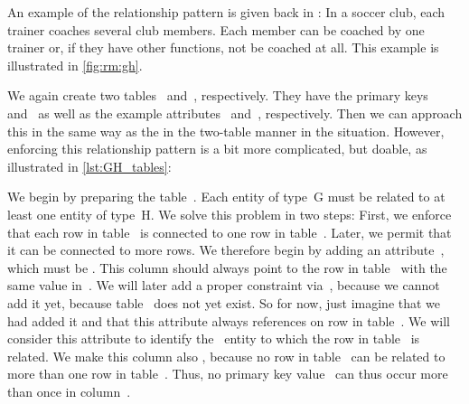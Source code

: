 An example of the  relationship pattern is given back in :
In a soccer club, each trainer coaches several club members.
Each member can be coached by one trainer or, if they have other functions, not be coached at all.
This example is illustrated in \cref{fig:rm:gh}.

We again create two tables~ and~, respectively.
They have the primary keys~ and~ as well as the example attributes~ and~, respectively.
Then we can approach this in the same way as the in the two-table manner in the  situation.
However, enforcing this relationship pattern is a bit more complicated, but doable, as illustrated in \cref{lst:GH_tables}:

We begin by preparing the table~.
Each entity of type~G must be related to at least one entity of type~H.
We solve this problem in two steps:
First, we enforce that each row in table~ is connected to one row in table~.
Later, we permit that it can be connected to more rows.
We therefore begin by adding an attribute~, which must be .
This column should always point to the row in table~ with the same value in~.
We will later add a proper  constraint via~, because we cannot add it yet, because table~ does not yet exist.
So for now, just imagine that we had added it and that this attribute always references on row in table~.
We will consider this attribute to identify the ~entity to which the row in table~ is related.
We make this column also , because no row in table~ can be related to more than one row in table~.
Thus, no primary key value~ can thus occur more than once in column~.

